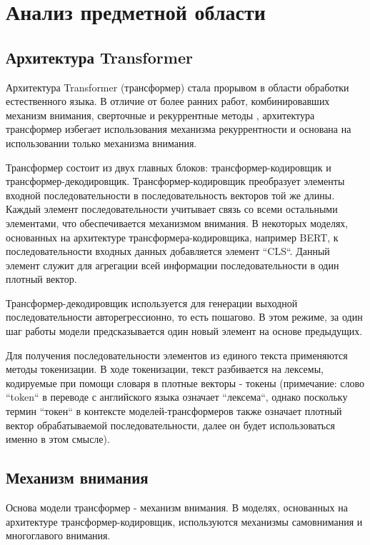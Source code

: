 \documentclass[times,specification,annotation]{itmo-student-thesis}
\begin{document}
\chapter{Анализ предметной области}
\section{Архитектура Transformer}

Архитектура Transformer\cite{transformer} (трансформер) стала прорывом в области обработки естественного языка. В отличие от более ранних работ, комбинировавших механизм внимания, сверточные и рекуррентные методы \cite{lstm_cnn_attention_model}, архитектура трансформер избегает использования механизма рекуррентности и основана на использовании только механизма внимания.

Трансформер состоит из двух главных блоков: трансформер-кодировщик и трансформер-декодировщик. Трансформер-кодировщик преобразует элементы входной последовательности в последовательность векторов той же длины. Каждый элемент последовательности учитывает связь со всеми остальными элементами, что обеспечивается механизмом внимания. В некоторых моделях, основанных на архитектуре трансформера-кодировщика, например BERT\cite{bert}, к последовательности входных данных добавляется элемент ``CLS``. Данный элемент служит для агрегации всей информации последовательности в один плотный вектор.

Трансформер-декодировщик используется для генерации выходной последовательности авторегрессионно, то есть пошагово. В этом режиме, за один шаг работы модели предсказывается один новый элемент на основе предыдущих. 

Для получения последовательности элементов из единого текста применяются методы токенизации. В ходе токенизации, текст разбивается на лексемы, кодируемые при помощи словаря в плотные векторы - токены (примечание: слово ``token`` в переводе с английского языка означает ``лексема``, однако поскольку термин ``токен`` в контексте моделей-трансформеров также означает плотный вектор обрабатываемой последовательности, далее он будет использоваться именно в этом смысле).

\section{Механизм внимания}

Основа модели трансформер - механизм внимания. В моделях, основанных на архитектуре трансформер-кодировщик, используются механизмы самовнимания и многоглавого внимания. 
\end{document}
